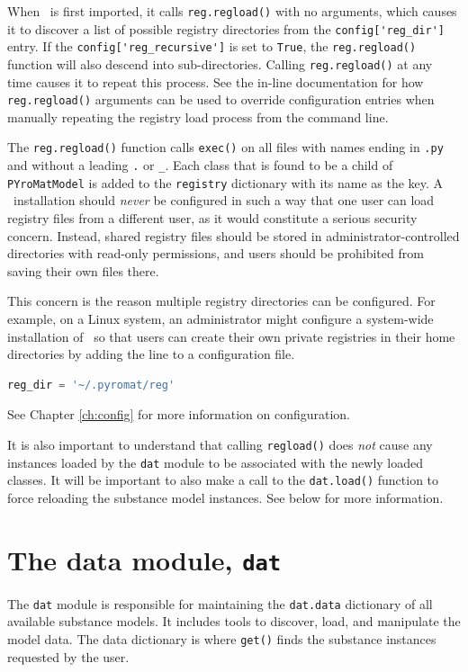 When \PM\ is first imported, it calls \texttt{reg.regload()} with no arguments, which causes it to discover a list of possible registry directories from the \verb|config['reg_dir']| entry.  If the \verb|config['reg_recursive']| is set to \texttt{True}, the \texttt{reg.regload()} function will also descend into sub-directories.  Calling \texttt{reg.regload()} at any time causes it to repeat this process.  See the in-line documentation for how \texttt{reg.regload()} arguments can be used to override configuration entries when manually repeating the registry load process from the command line.

The \texttt{reg.regload()} function calls \texttt{exec()} on all files with names ending in \texttt{.py} and without a leading \verb|.| or \verb|_|.  Each class that is found to be a child of \texttt{PYroMatModel} is added to the \texttt{registry} dictionary with its name as the key.  A \PM\ installation should \emph{never} be configured in such a way that one user can load registry files from a different user, as it would constitute a serious security concern.  Instead, shared registry files should be stored in administrator-controlled directories with read-only permissions, and users should be prohibited from saving their own files there.

This concern is the reason multiple registry directories can be configured.  For example, on a Linux system, an administrator might configure a system-wide installation of \PM\ so that users can create their own private registries in their home directories by adding the line to a configuration file.
\begin{lstlisting}[language=Python]
reg_dir = '~/.pyromat/reg'
\end{lstlisting}
See Chapter \ref{ch:config} for more information on configuration.

It is also important to understand that calling \texttt{regload()} does \emph{not} cause any instances loaded by the \texttt{dat} module to be associated with the newly loaded classes.  It will be important to also make a call to the \texttt{dat.load()} function to force reloading the substance model instances.  See below for more information.

\section{The data module, \texttt{dat}}

The \texttt{dat} module is responsible for maintaining the \texttt{dat.data} dictionary of all available substance models.  It includes tools to discover, load, and manipulate the model data.  The data dictionary is where \texttt{get()} finds the substance instances requested by the user.

